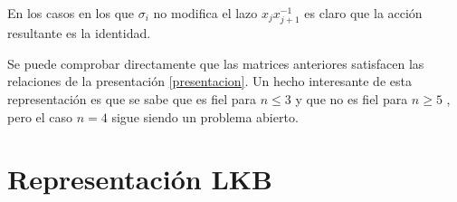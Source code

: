 \documentclass[TFG.tex]{subfiles}
\begin{document}
En los casos en los que $\sigma_i$ no modifica el lazo $x_jx_{j+1}^{-1}$ es claro que la acción resultante es la identidad. 
%
%
%

Se puede comprobar directamente que las matrices anteriores satisfacen las relaciones de la presentación \ref{presentacion}. Un hecho interesante de esta representación es que se sabe que es fiel para $n\leq 3$ \cite{Birman} y que no es fiel para $n\geq 5$ \cite{Bil}\cite{LP}, pero el caso $n=4$ sigue siendo un problema abierto.

\section{Representación LKB}
\end{document}

